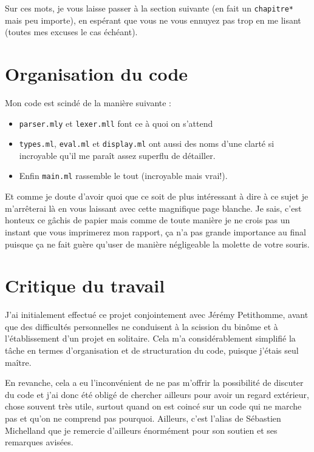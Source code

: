 \documentclass[12pt,a4paper]{report}
\begin{document}
Sur ces mots, je vous laisse passer à la section suivante (en fait un \verb?chapitre*? mais peu importe), en espérant que vous ne vous ennuyez pas trop en me lisant (toutes mes excuses le cas échéant).

\chapter*{Organisation du code}

Mon code est scindé de la manière suivante :

\begin{itemize}
	\item \verb?parser.mly? et \verb?lexer.mll? font ce à quoi on s'attend
	\item \verb?types.ml?, \verb?eval.ml? et \verb?display.ml? ont aussi des noms d'une clarté si incroyable qu'il me paraît assez superflu de détailler.
	\item Enfin \verb?main.ml? rassemble le tout (incroyable mais vrai!).
\end{itemize}

\bigskip
Et comme je doute d'avoir quoi que ce soit de plus intéressant à dire à ce sujet je m'arrêterai là en vous laissant avec cette magnifique page blanche. Je sais, c'est honteux ce gâchis de papier mais comme de toute manière je ne crois pas un instant que vous imprimerez mon rapport, ça n'a pas grande importance au final puisque ça ne fait guère qu'user de manière négligeable la molette de votre souris.

\chapter*{Critique du travail}

J'ai initialement effectué ce projet conjointement avec Jérémy Petithomme, avant que des difficultés personnelles ne conduisent à la scission du binôme et à l'établissement d'un projet en solitaire. Cela m'a considérablement simplifié la tâche en termes d'organisation et de structuration du code, puisque j'étais seul maître.

En revanche, cela a eu l'inconvénient de ne pas m'offrir la possibilité de discuter du code et j'ai donc été obligé de chercher ailleurs pour avoir un regard extérieur, chose souvent très utile, surtout quand on est coincé sur un code qui ne marche pas et qu'on ne comprend pas pourquoi. Ailleurs, c'est l'alias de Sébastien Michelland que je remercie d'ailleurs énormément pour son soutien et ses remarques avisées.
\end{document}
